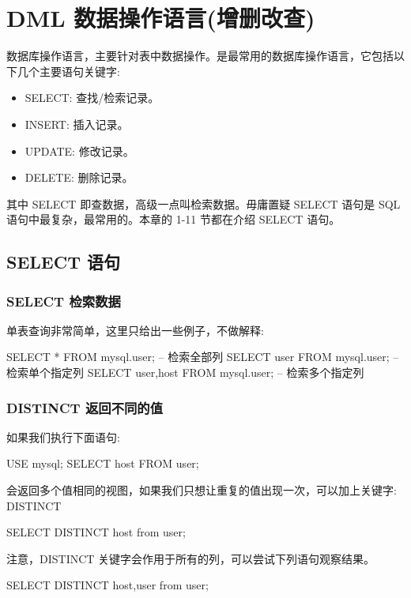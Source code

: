 \section{DML 数据操作语言(增删改查)}

数据库操作语言，主要针对表中数据操作。是最常用的数据库操作语言，它包括以下几个主要语句关键字:
\begin{itemize}
    \item SELECT: 查找/检索记录。
    \item INSERT: 插入记录。
    \item UPDATE: 修改记录。
    \item DELETE: 删除记录。
\end{itemize}

其中 SELECT 即查数据，高级一点叫检索数据。毋庸置疑 SELECT 语句是 SQL 语句中最复杂，最常用的。本章的 1-11 节都在介绍 SELECT 语句。

\subsection{SELECT 语句}
\subsubsection{SELECT 检索数据}

单表查询非常简单，这里只给出一些例子，不做解释:

\begin{sql}
SELECT * FROM mysql.user;       -- 检索全部列
SELECT user FROM mysql.user;    -- 检索单个指定列
SELECT user,host FROM mysql.user;   -- 检索多个指定列
\end{sql}

\subsubsection{DISTINCT 返回不同的值}

如果我们执行下面语句:
\begin{sql}
USE mysql;
SELECT host FROM user;
\end{sql}

会返回多个值相同的视图，如果我们只想让重复的值出现一次，可以加上关键字: DISTINCT

\begin{sql}
SELECT DISTINCT host from user;
\end{sql}

注意，DISTINCT 关键字会作用于所有的列，可以尝试下列语句观察结果。

\begin{sql}
SELECT DISTINCT host,user from user;
\end{sql}

